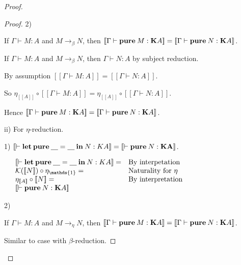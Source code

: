 \documentclass[a4paper]{article}
\begin{document}
\begin{proof}
\begin{proof}
2)

If $\Gamma \vdash M : A$ and $M \rightarrow_{\beta} N$, then $[\![\Gamma \vdash {\bf pure \:} M : {\bf K}A]\!] = [\![\Gamma \vdash {\bf pure \:} N : {\bf K}A]\!]$.

\vspace{\baselineskip}

If $\Gamma \vdash M : A$ and $M \rightarrow_{\beta} N$, then $\Gamma \vdash N : A$ by subject reduction.

By assumption $[\![\Gamma \vdash M : A]\!] = [\![\Gamma \vdash N : A]\!]$.

So $\eta_{[\![A]\!]} \circ [\![\Gamma \vdash M : A]\!] = \eta_{[\![A]\!]} \circ [\![\Gamma \vdash N : A]\!]$.

Hence $[\![\Gamma \vdash {\bf pure \:} M : {\bf K}A]\!] = [\![\Gamma \vdash {\bf pure \:} N : {\bf K}A]\!]$.

\vspace{\baselineskip}

ii) For $\eta$-reduction.

1) $[\![\vdash {\bf let \: pure \:} \underline{\quad} = \underline{\quad} {\: \bf in \:} N : {\bf }K A ]\!] = [\![\vdash {\bf pure \:} N : {\bf K A}]\!]$.

\vspace{\baselineskip}

$\begin{array}{lll}
&[\![\vdash {\bf let \: pure \:} \underline{\quad} = \underline{\quad} {\: \bf in \:} N : {\bf }K A ]\!] = & \text{By interpetation}\\
&\mathcal{K}([\![N]\!]) \circ \eta_{\mathds{1}} =& \text{Naturality for $\eta$} \\
&\eta_{[\![A]\!]} \circ [\![N]\!] =& \text{By interpretation} \\
&[\![\vdash {\bf pure \:} N : {\bf K} A]\!]&
\end{array}$

\vspace{\baselineskip}

2)

If $\Gamma \vdash M : A$ and $M \rightarrow_{\eta} N$, then $[\![\Gamma \vdash {\bf pure \:} M : {\bf K}A]\!] = [\![\Gamma \vdash {\bf pure \:} N : {\bf K}A]\!]$.

\vspace{\baselineskip}

Similar to case with $\beta$-reduction.

\end{proof}

\end{proof}
\end{document}
